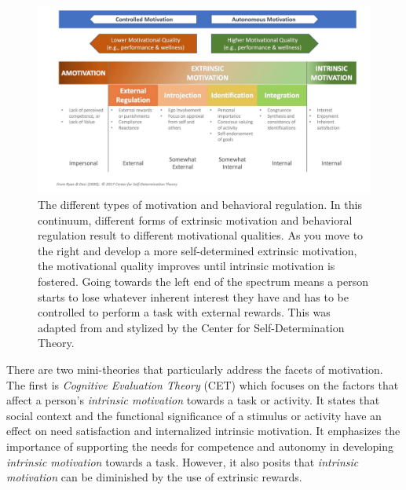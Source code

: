 \begin{figure}[t]
  \centering
  \includegraphics[scale=0.2]{figures/sdt.jpg}
  \caption{The different types of motivation and behavioral regulation. In this continuum, different forms of extrinsic motivation and behavioral regulation result to different motivational qualities. As you move to the right and develop a more self-determined extrinsic motivation, the motivational quality improves until intrinsic motivation is fostered. Going towards the left end of the spectrum means a person starts to lose whatever inherent interest they have and has to be controlled to perform a task with external rewards. This was adapted from \cite{ryan2000intrinsic,ryan2017organismic} and stylized by the Center for Self-Determination Theory.}
  \label{fig:sdt}
\end{figure}

There are two mini-theories that particularly address the facets of motivation. The first is \textit{Cognitive Evaluation Theory} (CET) which focuses on the factors that affect a person's \textit{intrinsic motivation} towards a task or activity. It states that social context and the functional significance of a stimulus or activity have an effect on need satisfaction and internalized intrinsic motivation\cite{deci2000and}. It emphasizes the importance of supporting the needs for competence and autonomy in developing \textit{intrinsic motivation} towards a task. However, it also posits that \textit{intrinsic motivation} can be diminished by the use of extrinsic rewards.  

